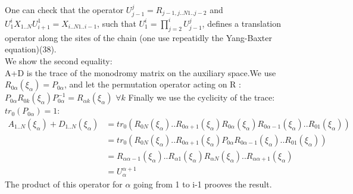 \documentclass[12pt]{article}
\begin{document}
One can check that the operator $U_{j-1}^{j}=R_{j-1,j..N1..j-2}$ and  $U_{1}^{i}X_{1..N}U_{i+1}^{1}=X_{i..N1..i-1}$, such that $U_{1}^{i}=\prod_{j=2}^{i}U_{j-1}^{j}$,  defines a translation operator along the sites of the chain (one use repeatidly the Yang-Baxter equation)(38)\cite{MaiT00}.\\ We show the second equality: \\
A+D is the trace of the monodromy matrix on the auxiliary space.We use $R_{0\alpha}(\xi_{\alpha})=P_{0\alpha}$, and let the permutation operator acting on R : $P_{0\alpha}R_{0k}(\xi_{\alpha})P_{0\alpha}^{-1}=R_{\alpha k}(\xi_{\alpha})$ $\forall k $
Finally we use the cyclicity of the trace: 
$tr_{0}(P_{0\alpha})=1$:
\begin{align*} 
A_{1..N}(\xi_{\alpha})+D_{1..N}(\xi_{\alpha})& =tr_{0}(R_{0N}(\xi_{\alpha})..R_{0\alpha+1}(\xi_{\alpha})R_{0\alpha}(\xi_{\alpha})R_{0\alpha-1}(\xi_{\alpha})..R_{01}(\xi_{\alpha}))\\
& =tr_{0}(R_{0N}(\xi_{\alpha})..R_{0\alpha+1}(\xi_{\alpha})P_{0\alpha}R_{0\alpha-1}(\xi_{\alpha})..R_{01}(\xi_{\alpha})) \\
& =R_{\alpha\alpha-1}(\xi_{\alpha})..R_{\alpha 1}(\xi_{\alpha})R_{\alpha N}(\xi_{\alpha})..R_{\alpha \alpha +1}(\xi_{\alpha})\\ 
& =U_{\alpha}^{\alpha+1}
\end{align*}
The product of this operator for  $\alpha$ going from 1 to i-1 prooves the result.
\end{document}
